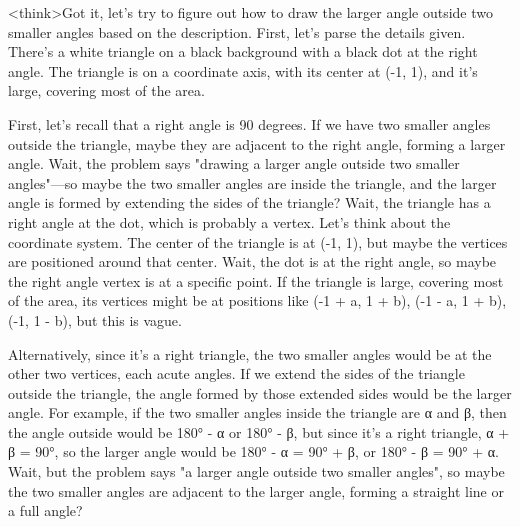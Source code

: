 <think>Got it, let's try to figure out how to draw the larger angle outside two smaller angles based on the description. First, let's parse the details given. There's a white triangle on a black background with a black dot at the right angle. The triangle is on a coordinate axis, with its center at (-1, 1), and it's large, covering most of the area. 

First, let's recall that a right angle is 90 degrees. If we have two smaller angles outside the triangle, maybe they are adjacent to the right angle, forming a larger angle. Wait, the problem says "drawing a larger angle outside two smaller angles"—so maybe the two smaller angles are inside the triangle, and the larger angle is formed by extending the sides of the triangle? Wait, the triangle has a right angle at the dot, which is probably a vertex. Let's think about the coordinate system. The center of the triangle is at (-1, 1), but maybe the vertices are positioned around that center. Wait, the dot is at the right angle, so maybe the right angle vertex is at a specific point. If the triangle is large, covering most of the area, its vertices might be at positions like (-1 + a, 1 + b), (-1 - a, 1 + b), (-1, 1 - b), but this is vague. 

Alternatively, since it's a right triangle, the two smaller angles would be at the other two vertices, each acute angles. If we extend the sides of the triangle outside the triangle, the angle formed by those extended sides would be the larger angle. For example, if the two smaller angles inside the triangle are α and β, then the angle outside would be 180° - α or 180° - β, but since it's a right triangle, α + β = 90°, so the larger angle would be 180° - α = 90° + β, or 180° - β = 90° + α. Wait, but the problem says "a larger angle outside two smaller angles", so maybe the two smaller angles are adjacent to the larger angle, forming a straight line or a full angle? 

